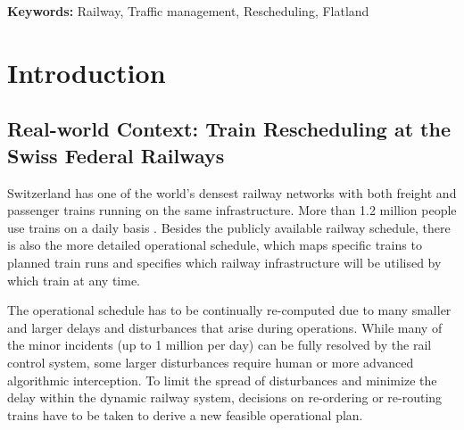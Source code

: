 \documentclass{article}
\begin{document}
\vspace{0.5cm}
\noindent \textbf{Keywords:} Railway, Traffic management, Rescheduling, Flatland \\

\section{Introduction}


\subsection{Real-world Context: Train Rescheduling at the Swiss Federal Railways} \label{sec:SBBcontext}
Switzerland has one of the world's densest railway networks with both freight and passenger trains running on the same infrastructure. More than 1.2 million people use trains on a daily basis \cite{rcsbrochure}.
Besides the publicly available railway schedule, there is also the more detailed operational schedule, which maps specific trains to planned train runs and specifies which railway infrastructure will be utilised by which train at any time.

The operational schedule has to be continually re-computed due to many smaller and larger delays and disturbances that arise during operations. While many of the minor incidents (up to 1 million per day) can be fully resolved by the rail control system, some larger disturbances require human or more advanced algorithmic interception. To limit the spread of disturbances and minimize the delay within the dynamic railway system, decisions on re-ordering or re-routing trains have to be taken to derive a new feasible operational plan.
\end{document}
